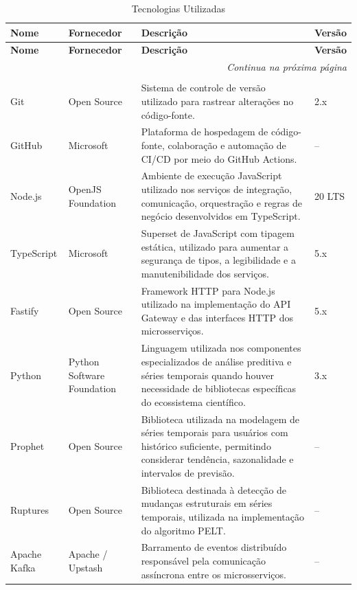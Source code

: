 {\small
\begin{longtable}{|p{3.2cm}|p{2.8cm}|p{6.7cm}|p{1.5cm}|}
\caption{Tecnologias Utilizadas} \label{qua:tecnologias} \\
\hline
\textbf{Nome} & \textbf{Fornecedor} & \textbf{Descrição} & \textbf{Versão} \\ \hline
\endfirsthead
\hline
\textbf{Nome} & \textbf{Fornecedor} & \textbf{Descrição} & \textbf{Versão} \\ \hline
\endhead
\hline
\multicolumn{4}{r}{\fontsize{10pt}{10pt}\selectfont\textit{Continua na próxima página}} \\
\endfoot
\hline
\multicolumn{4}{c}{\fontsize{10pt}{10pt}\selectfont \textbf{Fonte:} Elaborado pelos autores (2026).} \\
\endlastfoot

Git & Open Source & Sistema de controle de versão utilizado para rastrear alterações no código-fonte. & 2.x \\ \hline
GitHub & Microsoft & Plataforma de hospedagem de código-fonte, colaboração e automação de CI/CD por meio do GitHub Actions. & -- \\ \hline
Node.js & OpenJS Foundation & Ambiente de execução JavaScript utilizado nos serviços de integração, comunicação, orquestração e regras de negócio desenvolvidos em TypeScript. & 20 LTS \\ \hline
TypeScript & Microsoft & Superset de JavaScript com tipagem estática, utilizado para aumentar a segurança de tipos, a legibilidade e a manutenibilidade dos serviços. & 5.x \\ \hline
Fastify & Open Source & Framework HTTP para Node.js utilizado na implementação do API Gateway e das interfaces HTTP dos microsserviços. & 5.x \\ \hline
Python & Python Software Foundation & Linguagem utilizada nos componentes especializados de análise preditiva e séries temporais quando houver necessidade de bibliotecas específicas do ecossistema científico. & 3.x \\ \hline
Prophet & Open Source & Biblioteca utilizada na modelagem de séries temporais para usuários com histórico suficiente, permitindo considerar tendência, sazonalidade e intervalos de previsão. & -- \\ \hline
Ruptures & Open Source & Biblioteca destinada à detecção de mudanças estruturais em séries temporais, utilizada na implementação do algoritmo PELT. & -- \\ \hline
Apache Kafka & Apache / Upstash & Barramento de eventos distribuído responsável pela comunicação assíncrona entre os microsserviços. & -- \\ \hline

\end{longtable}}
